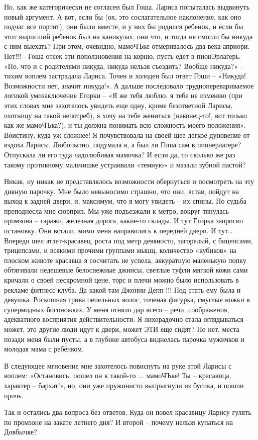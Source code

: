 Но, как же категорически не согласен был Гоша. Лариса попыталась выдвинуть
новый аргумент. А вот, если бы (ох, это сослагательное наклонение, как оно
подчас все портит), они были вместе, и у них бы родился ребенок, и если бы этот
выросший ребенок был на каникулах, они что, и тогда не смогли бы никуда с ним
выехать? При этом, очевидно, мамоЧЪке отмеривалось два века априори. Нет!!! -
Гоша отсек эти поползновения на корню, пусть едет в пионЭрлагерь. «Но, что и с
родителями никуда, никуда нельзя съездить? Вообще никуда?» – тихим воплем
застрадала Лариса. Точен и холоден был ответ Гоши – «Никуда! Возможности нет,
значит никуда!». А дальше последовало трудноперевариваемое логикой
умозаключение Егорки – «Я же тебя люблю, я тебе не изменяю (при этих словах мне
захотелось увидеть еще одну, кроме безответной Ларисы, охотницу на такой
непотреб), я хочу на тебе жениться (наконец-то!, вот только как же мамоЧЪка?),
и ты должна понимать всю сложность моего положения». Воистину, куда уж сложнее!
Я почувствовала на своей шее легкое дуновение от вздоха Ларисы. Любопытно,
подумала я, а был ли Гоша сам в пионерлагере? Отпускала ли его туда чадолюбивая
мамочка? И если да, то сколько же раз такому противному мальчишке устраивали
«темную» и мазали зубной пастой?

Никак, ну никак не представлялось возможности обернуться и посмотреть на эту
дивную парочку. Мне было невыносимо страшно, что они, встав, пойдут на выход к
задней двери, и, максимум, что я могу увидеть – их спины. Но судьба преподнесла
мне сюрприз. Мы уже подъезжали к метро, вокруг тянулась промзона – гаражи,
железная дорога, какие-то склады. И тут Егорка запросил остановку. Они встали,
мимо меня направились к передней двери. И тут… Впереди шел атлет-красавец,
роста под метр девяносто, загорелый, с бицепсами, трицепсами, и всякими прочими
группами мышц, количество «кубиков» на плоском животе красавца я сосчитать не
успела, аккуратную маленькую попку обтягивали недешевые белоснежные джинсы,
светлые туфли мягкой кожи сами кричали о своей нескромной цене, торс и плечи
можно было использовать в рекламе фитнесс-клуба. Да какой там Джонни Депп !!!
Под стать ему была и девушка. Роскошная грива пепельных волос, точеная фигурка,
смуглые ножки в супермодных босоножках. У меня отняло дар всего – речи,
соображения, адекватного восприятия действительности. Я лихорадочно стала
оглядываться – может, это другие люди идут к двери, может ЭТИ еще сидят? Но
нет, места позади меня были пусты, а в глубине автобуса виднелась парочка
мужичков и молодая мама с ребёнком.

В следующее мгновение мне захотелось повиснуть на руке этой Ларисы с воплем:
«Остановись, пошел он к такой-то ... мамоЧЪке! Ты – красавица, характер –
бархат!», но, они уже пружинисто выпрыгнули из бусика, и пошли прочь.

Так и остались два вопроса без ответов. Куда он повел красавицу Ларису гулять
по промзоне на закате летнего дня? И второй – почему нельзя купаться на
Довбычке?

